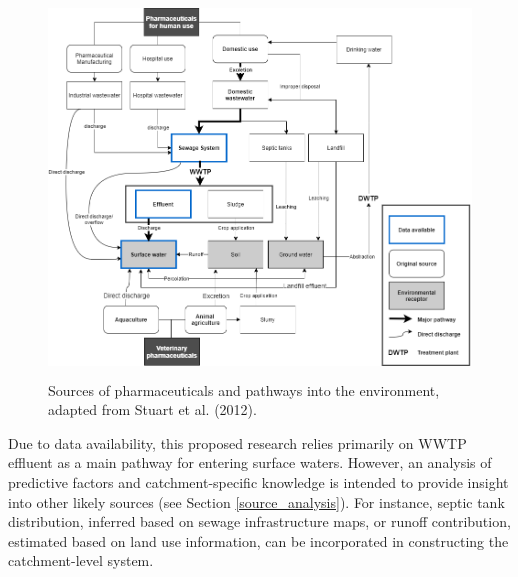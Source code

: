 \documentclass{article}
\begin{document}
\begin{figure}[t]
    \centering
    \includegraphics[height=10cm]{fig_sources.png}
    \caption{Sources of pharmaceuticals and pathways into the environment, adapted from Stuart et al. (2012).}
    \label{fig_sources}
\end{figure}

Due to data availability, this proposed research relies primarily on WWTP effluent as a main pathway for entering surface waters. However, an analysis of predictive factors and catchment-specific knowledge is intended to provide insight into other likely sources (see Section \ref{source_analysis}). For instance, septic tank distribution, inferred based on sewage infrastructure maps, or runoff contribution, estimated based on land use information, can be incorporated in constructing the catchment-level system.
\end{document}
